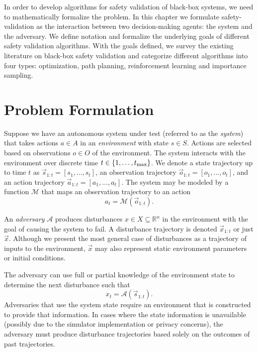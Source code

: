 In order to develop algorithms for safety validation of black-box systems, we need to mathematically formalize the problem. In this chapter we formulate safety-validation as the interaction between two decision-making agents: the system and the adversary. We define notation and formalize the underlying goals of different safety validation algorithms. With the goals defined, we survey the existing literature on black-box safety validation and categorize different algorithms into four types: optimization, path planning, reinforcement learning and importance sampling. 

\section{Problem Formulation}

Suppose we have an autonomous system under test (referred to as the \emph{system}) that takes actions $a \in A$ in an \emph{environment} with state $s \in S$. Actions are selected based on observations $o \in O$ of the environment. The system interacts with the environment over discrete time $t \in \{1, \ldots, t_{\rm max}\}$. We denote a state trajectory up to time $t$ as $\vec{s}_{1:t} = [s_1, \ldots, s_t]$, an observation trajectory $\vec{o}_{1:t} = [o_1, \ldots, o_t]$, and an action trajectory $\vec{a}_{1:t} = [a_1, \ldots, a_t]$. The system may be modeled by a function $\mathcal{M}$ that maps an observation trajectory to an action
\begin{equation}
    a_t = \mathcal{M}(\vec{o}_{1:t}) \text{.} \label{eq:system} 
\end{equation}

An \emph{adversary} $\mathcal{A}$ produces disturbances $x \in X\subseteq \mathbb{R}^n$ in the environment with the goal of causing the system to fail. A disturbance trajectory is denoted $\vec{x}_{1:t}$ or just $\vec{x}$. Although we present the most general case of disturbances as a trajectory of inputs to the environment, $\vec{x}$ may also represent static environment parameters or initial conditions. 

The adversary can use full or partial knowledge of the environment state to determine the next disturbance such that
\begin{equation}
    x_t = \mathcal{A}(\vec{s}_{1:t}) \text{.} \label{eq:adversary}
\end{equation}
Adversaries that use the system state require an environment that is constructed to provide that information. In cases where the state information is unavailable (possibly due to the simulator implementation or privacy concerns), the adversary must produce disturbance trajectories based solely on the outcomes of past trajectories. 

